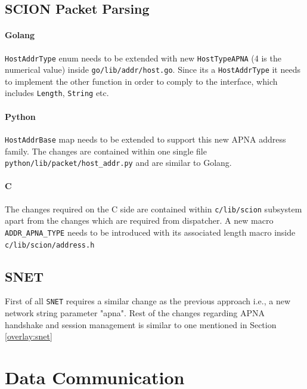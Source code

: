 \subsection{SCION Packet Parsing}

\paragraph{Golang}
\texttt{HostAddrType} enum needs to be extended with new \texttt{HostTypeAPNA} (4 is the numerical value) inside \texttt{go/lib/addr/host.go}. Since its a \texttt{HostAddrType} it needs to implement the other function in order to comply to the interface, which includes \texttt{Length}, \texttt{String} etc. 

\paragraph{Python}
\texttt{HostAddrBase} map needs to be extended to support this new APNA address family. The changes are contained within one single file \texttt{python/lib/packet/host\_addr.py} and are similar to Golang.

\paragraph{C}
The changes required on the C side are contained within \texttt{c/lib/scion} subsystem apart from the changes which are required from dispatcher. A new macro \texttt{ADDR\_APNA\_TYPE} needs to be introduced with its associated length macro inside \texttt{c/lib/scion/address.h}

\subsection{SNET}
First of all \texttt{SNET} requires a similar change as the previous approach i.e., a new network string parameter "apna". Rest of the changes regarding APNA handshake and session management is similar to one mentioned in Section \ref{overlay:snet}

\section{Data Communication} \label{addr:data}

